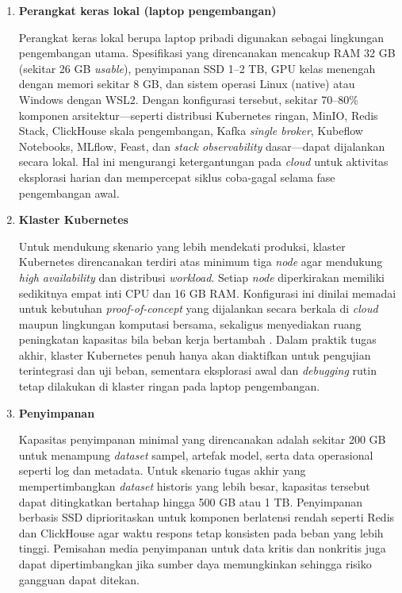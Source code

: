 \begin{enumerate}
    \item \textbf{Perangkat keras lokal (laptop pengembangan)}
    
    Perangkat keras lokal berupa laptop pribadi digunakan sebagai lingkungan pengembangan utama. Spesifikasi yang direncanakan mencakup RAM 32 GB (sekitar 26 GB \textit{usable}), penyimpanan SSD 1--2 TB, GPU kelas menengah dengan memori sekitar 8 GB, dan sistem operasi Linux (native) atau Windows dengan WSL2. Dengan konfigurasi tersebut, sekitar 70--80\% komponen arsitektur---seperti distribusi Kubernetes ringan, MinIO, Redis Stack, ClickHouse skala pengembangan, Kafka \textit{single broker}, Kubeflow Notebooks, MLflow, Feast, dan \textit{stack observability} dasar---dapat dijalankan secara lokal. Hal ini mengurangi ketergantungan pada \textit{cloud} untuk aktivitas eksplorasi harian dan mempercepat siklus coba-gagal selama fase pengembangan awal.
    
    \vspace{0.5em}
    
    \item \textbf{Klaster Kubernetes}
    
    Untuk mendukung skenario yang lebih mendekati produksi, klaster Kubernetes direncanakan terdiri atas minimum tiga \textit{node} agar mendukung \textit{high availability} dan distribusi \textit{workload}. Setiap \textit{node} diperkirakan memiliki sedikitnya empat inti CPU dan 16 GB RAM. Konfigurasi ini dinilai memadai untuk kebutuhan \textit{proof-of-concept} yang dijalankan secara berkala di \textit{cloud} maupun lingkungan komputasi bersama, sekaligus menyediakan ruang peningkatan kapasitas bila beban kerja bertambah \parencite{lakka2025kubernetes}. Dalam praktik tugas akhir, klaster Kubernetes penuh hanya akan diaktifkan untuk pengujian terintegrasi dan uji beban, sementara eksplorasi awal dan \textit{debugging} rutin tetap dilakukan di klaster ringan pada laptop pengembangan.
    
    \vspace{0.5em}
    
    \item \textbf{Penyimpanan}
    
    Kapasitas penyimpanan minimal yang direncanakan adalah sekitar 200 GB untuk menampung \textit{dataset} sampel, artefak model, serta data operasional seperti log dan metadata. Untuk skenario tugas akhir yang mempertimbangkan \textit{dataset} historis yang lebih besar, kapasitas tersebut dapat ditingkatkan bertahap hingga 500 GB atau 1 TB. Penyimpanan berbasis SSD diprioritaskan untuk komponen berlatensi rendah seperti Redis dan ClickHouse agar waktu respons tetap konsisten pada beban yang lebih tinggi. Pemisahan media penyimpanan untuk data kritis dan nonkritis juga dapat dipertimbangkan jika sumber daya memungkinkan sehingga risiko gangguan dapat ditekan.
    

\end{enumerate}
